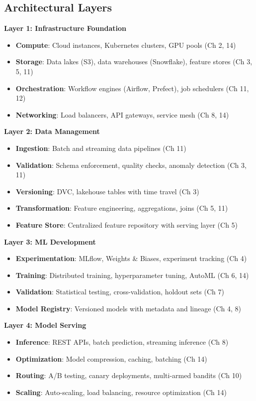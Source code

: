 \subsection{Architectural Layers}

\textbf{Layer 1: Infrastructure Foundation}
\begin{itemize}
    \item \textbf{Compute}: Cloud instances, Kubernetes clusters, GPU pools (Ch 2, 14)
    \item \textbf{Storage}: Data lakes (S3), data warehouses (Snowflake), feature stores (Ch 3, 5, 11)
    \item \textbf{Orchestration}: Workflow engines (Airflow, Prefect), job schedulers (Ch 11, 12)
    \item \textbf{Networking}: Load balancers, API gateways, service mesh (Ch 8, 14)
\end{itemize}

\textbf{Layer 2: Data Management}
\begin{itemize}
    \item \textbf{Ingestion}: Batch and streaming data pipelines (Ch 11)
    \item \textbf{Validation}: Schema enforcement, quality checks, anomaly detection (Ch 3, 11)
    \item \textbf{Versioning}: DVC, lakehouse tables with time travel (Ch 3)
    \item \textbf{Transformation}: Feature engineering, aggregations, joins (Ch 5, 11)
    \item \textbf{Feature Store}: Centralized feature repository with serving layer (Ch 5)
\end{itemize}

\textbf{Layer 3: ML Development}
\begin{itemize}
    \item \textbf{Experimentation}: MLflow, Weights \& Biases, experiment tracking (Ch 4)
    \item \textbf{Training}: Distributed training, hyperparameter tuning, AutoML (Ch 6, 14)
    \item \textbf{Validation}: Statistical testing, cross-validation, holdout sets (Ch 7)
    \item \textbf{Model Registry}: Versioned models with metadata and lineage (Ch 4, 8)
\end{itemize}

\textbf{Layer 4: Model Serving}
\begin{itemize}
    \item \textbf{Inference}: REST APIs, batch prediction, streaming inference (Ch 8)
    \item \textbf{Optimization}: Model compression, caching, batching (Ch 14)
    \item \textbf{Routing}: A/B testing, canary deployments, multi-armed bandits (Ch 10)
    \item \textbf{Scaling}: Auto-scaling, load balancing, resource optimization (Ch 14)
\end{itemize}

